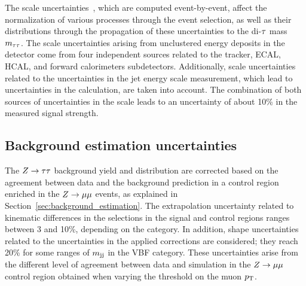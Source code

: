 The \etvecmiss scale uncertainties~\cite{CMS-JME-12-002}, which are computed event-by-event, affect the normalization of various processes through the event selection, as well as their distributions through the propagation of these uncertainties to the di-$\tau$ mass $m_{\tau\tau}$. The \etvecmiss scale uncertainties arising from unclustered energy deposits in the detector come from four independent sources related to the tracker, ECAL, HCAL, and forward calorimeters subdetectors. Additionally, \etvecmiss scale uncertainties related to the uncertainties in the jet energy scale measurement, which lead to uncertainties in the \etvecmiss calculation, are taken into account. The combination of both sources of uncertainties in the \etvecmiss scale leads to an uncertainty of about 10\% in the measured signal strength.

\subsection{Background estimation uncertainties}

The $Z\to\tau\tau$ background yield and distribution are corrected based on the agreement between data and the background prediction in a control region enriched in the $Z\to\mu\mu$ events, as explained in Section~\ref{sec:background_estimation}.
The extrapolation uncertainty related to kinematic differences in the selections in the signal and control regions ranges between 3 and 10\%, depending
on the category. In addition, shape uncertainties related to the uncertainties in the applied corrections are considered; they reach 20\% for some ranges of $m_\mathrm{jj}$ in the VBF category. These uncertainties arise from the different level of agreement between data and simulation in the $Z\to\mu\mu$ control region obtained when varying the threshold on the muon $p_\mathrm{T}$.

